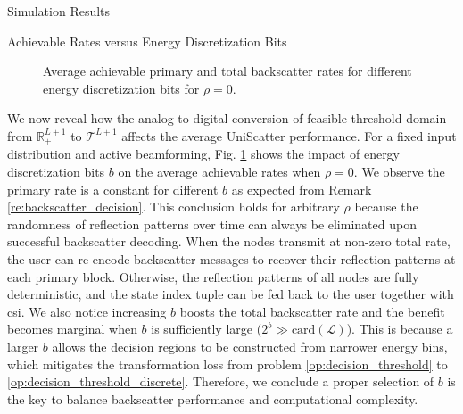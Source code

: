 \documentclass[journal]{IEEEtran}
\begin{document}
\begin{section}{Simulation Results}
	\begin{subsection}{Achievable Rates versus Energy Discretization Bits}
		\begin{figure}[!t]
			\caption{Average achievable primary and total backscatter rates for different energy discretization bits for $\rho=0$.}
			\label{fi:rate_bits}
		\end{figure}
		We now reveal how the analog-to-digital conversion of feasible threshold domain from $\mathbb{R}_+^{L+1}$ to $\mathcal{T}^{L+1}$ affects the average UniScatter performance.
		For a fixed input distribution and active beamforming, Fig. \ref{fi:rate_bits} shows the impact of energy discretization bits $b$ on the average achievable rates when $\rho=0$.
		We observe the primary rate is a constant for different $b$ as expected from Remark \ref{re:backscatter_decision}.
		This conclusion holds for arbitrary $\rho$ because the randomness of reflection patterns over time can always be eliminated upon successful backscatter decoding.
		When the nodes transmit at non-zero total rate, the user can re-encode backscatter messages to recover their reflection patterns at each primary block.
		Otherwise, the reflection patterns of all nodes are fully deterministic, and the state index tuple can be fed back to the user together with \gls{csi}.
		We also notice increasing $b$ boosts the total backscatter rate and the benefit becomes marginal when $b$ is sufficiently large ($2^b \gg \mathrm{card}(\mathcal{L})$).
		This is because a larger $b$ allows the decision regions to be constructed from narrower energy bins, which mitigates the transformation loss from problem \eqref{op:decision_threshold} to \eqref{op:decision_threshold_discrete}.
		Therefore, we conclude a proper selection of $b$ is the key to balance backscatter performance and computational complexity.
	\end{subsection}


\end{section}
\end{document}
